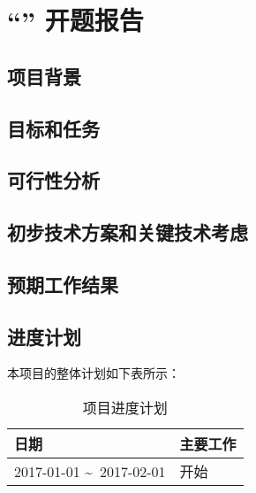 \chapter*{``\zjutitlec'' 开题报告}

\section{项目背景}

\cite{article1}

\section{目标和任务}

\section{可行性分析}

\section{初步技术方案和关键技术考虑}

\section{预期工作结果}

\section{进度计划}

本项目的整体计划如下表所示：

\begin{table}[!htbp]
\centering
\begin{tabular}{|l|l|}
\hline
日期 & 主要工作 \\ \hline
2017-01-01 \textasciitilde\ 2017-02-01 & 开始 \\ \hline
\end{tabular}
\caption{项目进度计划}
\label{table:schedule}
\end{table}


{
\renewcommand{\chapter}[2]{\section*{#2}\addcontentsline{toc}{section}{#2}}

}

